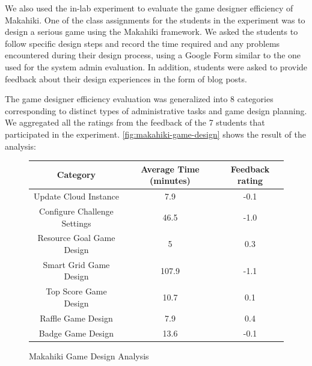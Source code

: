 \documentclass{sigchi}
\newcommand\tabhead[1]{\small\textbf{#1}}
\begin{document}
We also used the in-lab experiment to evaluate the game
designer efficiency of Makahiki. One of the class assignments for the students in the
experiment was to design a serious game using the Makahiki framework. We asked the students
to follow specific design steps and record the time required and any problems encountered during
their design process, using a Google Form similar to the one used for the system admin
evaluation. In addition, students were asked to provide feedback about their
design experiences in the form of blog posts.

The game designer efficiency evaluation was generalized into 8 categories corresponding to 
distinct types of administrative tasks and game design planning. We aggregated all the 
ratings from the feedback of the 7 students that participated in the experiment. 
\autoref{fig:makahiki-game-design} shows the result of the analysis:

\begin{figure}[ht!]
  \centering
  \begin{tabular}{|c|c|c|}
    \hline
    \multicolumn{1}{|p{0.5\columnwidth}|}{\centering\tabhead{Category}} &
    \multicolumn{1}{|p{0.2\columnwidth}|}{\centering\tabhead{Average Time (minutes)}} &
    \multicolumn{1}{|p{0.15\columnwidth}|}{\centering\tabhead{Feedback rating}} \\
    \hline
    \multicolumn{1}{|p{0.5\columnwidth}|}{Update Cloud Instance} &
    \multicolumn{1}{|p{0.2\columnwidth}|}{7.9} &
    \multicolumn{1}{|p{0.15\columnwidth}|}{-0.1} \\
    \hline
    \multicolumn{1}{|p{0.5\columnwidth}|}{Configure Challenge Settings} &
    \multicolumn{1}{|p{0.2\columnwidth}|}{46.5} &
    \multicolumn{1}{|p{0.15\columnwidth}|}{-1.0} \\
    \hline
    \multicolumn{1}{|p{0.5\columnwidth}|}{Resource Goal Game Design} &
    \multicolumn{1}{|p{0.2\columnwidth}|}{5} &
    \multicolumn{1}{|p{0.15\columnwidth}|}{0.3} \\
    \hline
    \multicolumn{1}{|p{0.5\columnwidth}|}{Smart Grid Game Design} &
    \multicolumn{1}{|p{0.2\columnwidth}|}{107.9} &
    \multicolumn{1}{|p{0.15\columnwidth}|}{-1.1} \\
    \hline
    \multicolumn{1}{|p{0.5\columnwidth}|}{Top Score Game Design} &
    \multicolumn{1}{|p{0.2\columnwidth}|}{10.7} &
    \multicolumn{1}{|p{0.15\columnwidth}|}{0.1} \\
    \hline
    \multicolumn{1}{|p{0.5\columnwidth}|}{Raffle Game Design} &
    \multicolumn{1}{|p{0.2\columnwidth}|}{7.9} &
    \multicolumn{1}{|p{0.15\columnwidth}|}{0.4} \\
    \hline
    \multicolumn{1}{|p{0.5\columnwidth}|}{Badge Game Design} &
    \multicolumn{1}{|p{0.2\columnwidth}|}{13.6} &
    \multicolumn{1}{|p{0.15\columnwidth}|}{-0.1} \\
    \hline
  \end{tabular}
  \caption{Makahiki Game Design Analysis}
  \label{fig:makahiki-game-design}
\end{figure}
\end{document}
